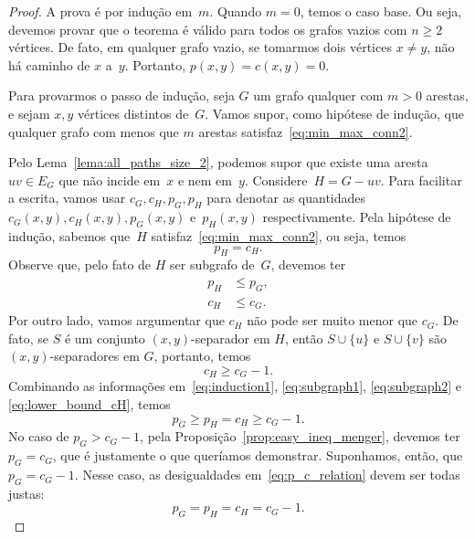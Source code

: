 \documentclass[12pt, a4paper]{article}
\theoremstyle{definition}
\begin{document}
\begin{proof}
  A prova é por indução em~$m$. Quando $m = 0$, temos o caso base. Ou seja, devemos provar que o teorema é válido para todos os grafos vazios com $n \geq 2$ vértices. De fato, em qualquer grafo vazio, se tomarmos dois vértices $x \neq y$, não há caminho de $x$ a~$y$. Portanto, $p(x,y) = c(x,y) = 0$.

Para provarmos o passo de indução, seja $G$ um grafo qualquer com $m > 0$ arestas, e sejam $x,y$ vértices distintos de~$G$. Vamos supor, como hipótese de indução, que qualquer grafo com menos que $m$ arestas satisfaz~\eqref{eq:min_max_conn2}.

Pelo Lema~\ref{lema:all_paths_size_2}, podemos supor que existe uma aresta~$uv \in E_G$ que não incide em~$x$ e nem em~$y$. Considere~$H = G - uv$.  Para facilitar a escrita, vamos usar $c_G,c_H,p_G,p_H$ para denotar as quantidades $c_G(x,y),  c_H(x,y), p_G(x,y)$ e~$p_H(x,y)$ respectivamente.
Pela hipótese de indução, sabemos que~$H$ satisfaz~\eqref{eq:min_max_conn2}, ou seja, temos
\begin{equation}
  \label{eq:induction1}
  p_H = c_H.
\end{equation}
Observe que, pelo fato de $H$ ser subgrafo de~$G$, devemos ter 
\begin{align}
\label{eq:subgraph1} p_H &\leq p_G,\\
\label{eq:subgraph2} c_H &\leq c_G.  
\end{align}
Por outro lado, vamos argumentar que $c_H$ não pode ser muito menor que $c_G$. De fato, se $S$ é um conjunto $(x,y)$-separador em $H$, então $S \cup \{u\}$ e $S \cup \{v\}$ são $(x,y)$-separadores em $G$, portanto, temos
\begin{equation}
  \label{eq:lower_bound_cH}
  c_H \geq c_G - 1.
\end{equation}
Combinando as informações em~\eqref{eq:induction1}, \eqref{eq:subgraph1}, \eqref{eq:subgraph2} e \eqref{eq:lower_bound_cH}, temos
\begin{equation}
  \label{eq:p_c_relation}
   p_G \geq p_H = c_H \geq c_G - 1.
\end{equation}
No caso de $p_G > c_G - 1$, pela Proposição~\ref{prop:easy_ineq_menger}, devemos ter $p_G = c_G$, que é justamente o que queríamos demonstrar. Suponhamos, então, que $p_G = c_G - 1$. Nesse caso, as desigualdades em~\eqref{eq:p_c_relation} devem ser todas justas:
\begin{equation}
  \label{eq:pG_equal_cG_minus_1}
  p_G = p_H = c_H = c_G - 1.
\end{equation}


\end{proof}
\end{document}
